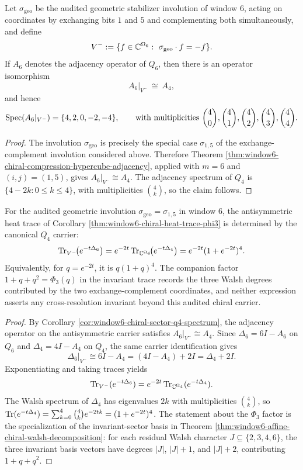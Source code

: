 \begin{corollary}\label{cor:window6-chiral-sector-q4-spectrum}
Let \(\sigma_{\mathrm{geo}}\) be the audited geometric stabilizer involution of window \(6\), acting on coordinates by exchanging bits \(1\) and \(5\) and complementing both simultaneously, and define
\[
V^-:=\{f\in\CC^{\Omega_6}: \ \sigma_{\mathrm{geo}}\cdot f=-f\}.
\]
If \(A_6\) denotes the adjacency operator of \(Q_6\), then there is an operator isomorphism
\[
A_6|_{V^-}\ \cong\ A_4,
\]
and hence
\[
\operatorname{Spec}(A_6|_{V^-})=\{4,2,0,-2,-4\},
\qquad
\text{with multiplicities }\binom40,\binom41,\binom42,\binom43,\binom44.
\]
\end{corollary}
\begin{proof}
The involution \(\sigma_{\mathrm{geo}}\) is precisely the special case \(\sigma_{1,5}\) of the exchange-complement involution considered above.
Therefore Theorem \ref{thm:window6-chiral-compression-hypercube-adjacency}, applied with \(m=6\) and \((i,j)=(1,5)\), gives \(A_6|_{V^-}\cong A_4\).
The adjacency spectrum of \(Q_4\) is \(\{4-2k:0\le k\le 4\}\), with multiplicities \(\binom{4}{k}\), so the claim follows. \qedhere
\end{proof}

\begin{corollary}\label{cor:window6-heat-trace-carrier-consequence}
For the audited geometric involution \(\sigma_{\mathrm{geo}}=\sigma_{1,5}\) in window \(6\), the antisymmetric heat trace of Corollary \ref{thm:window6-chiral-heat-trace-phi3} is determined by the canonical \(Q_4\) carrier:
\[
\operatorname{Tr}_{V^-}\!\bigl(e^{-t\Delta_6}\bigr)
=e^{-2t}\operatorname{Tr}_{\mathbb{C}^{\Omega_4}}\!\bigl(e^{-t\Delta_4}\bigr)
=e^{-2t}(1+e^{-2t})^4.
\]
Equivalently, for \(q=e^{-2t}\), it is \(q(1+q)^4\).  The companion factor \(1+q+q^2=\Phi_3(q)\) in the invariant trace records the three Walsh degrees contributed by the two exchange-complement coordinates, and neither expression asserts any cross-resolution invariant beyond this audited chiral carrier.
\end{corollary}

\begin{proof}
By Corollary \ref{cor:window6-chiral-sector-q4-spectrum}, the adjacency operator on the antisymmetric carrier satisfies
\(
A_6|_{V^-}\cong A_4
\).
Since \(\Delta_6=6I-A_6\) on \(Q_6\) and \(\Delta_4=4I-A_4\) on \(Q_4\), the same carrier identification gives
\[
\Delta_6|_{V^-}\cong 6I-A_4=(4I-A_4)+2I=\Delta_4+2I.
\]
Exponentiating and taking traces yields
\[
\operatorname{Tr}_{V^-}(e^{-t\Delta_6})=e^{-2t}\operatorname{Tr}_{\mathbb{C}^{\Omega_4}}(e^{-t\Delta_4}).
\]
The Walsh spectrum of \(\Delta_4\) has eigenvalues \(2k\) with multiplicities \(\binom4k\), so
\(
\operatorname{Tr}(e^{-t\Delta_4})=\sum_{k=0}^4\binom4k e^{-2tk}=(1+e^{-2t})^4
\).
The statement about the \(\Phi_3\) factor is the specialization of the invariant-sector basis in Theorem \ref{thm:window6-affine-chiral-walsh-decomposition}: for each residual Walsh character \(J\subseteq\{2,3,4,6\}\), the three invariant basis vectors have degrees \(|J|\), \(|J|+1\), and \(|J|+2\), contributing \(1+q+q^2\). \qedhere
\end{proof}

